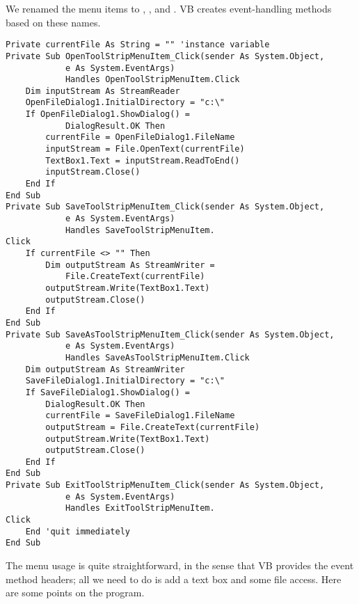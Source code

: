 		
		We renamed the menu items to , ,  and . VB creates event-handling methods based on these names.
		\begin{lstlisting}
Private currentFile As String = "" 'instance variable
Private Sub OpenToolStripMenuItem_Click(sender As System.Object,
			e As System.EventArgs)
			Handles OpenToolStripMenuItem.Click
	Dim inputStream As StreamReader
	OpenFileDialog1.InitialDirectory = "c:\"
	If OpenFileDialog1.ShowDialog() =
			DialogResult.OK Then
		currentFile = OpenFileDialog1.FileName
		inputStream = File.OpenText(currentFile)
		TextBox1.Text = inputStream.ReadToEnd()
		inputStream.Close()
	End If
End Sub
Private Sub SaveToolStripMenuItem_Click(sender As System.Object,
			e As System.EventArgs)
			Handles SaveToolStripMenuItem.
Click
	If currentFile <> "" Then
		Dim outputStream As StreamWriter =
			File.CreateText(currentFile)
		outputStream.Write(TextBox1.Text)
		outputStream.Close()
	End If
End Sub
Private Sub SaveAsToolStripMenuItem_Click(sender As System.Object,
			e As System.EventArgs)
			Handles SaveAsToolStripMenuItem.Click
	Dim outputStream As StreamWriter
	SaveFileDialog1.InitialDirectory = "c:\"
	If SaveFileDialog1.ShowDialog() =
		DialogResult.OK Then
		currentFile = SaveFileDialog1.FileName
		outputStream = File.CreateText(currentFile)
		outputStream.Write(TextBox1.Text)
		outputStream.Close()
	End If
End Sub
Private Sub ExitToolStripMenuItem_Click(sender As System.Object,
			e As System.EventArgs)
			Handles ExitToolStripMenuItem.
Click
	End 'quit immediately
End Sub
		\end{lstlisting}
		The menu usage is quite straightforward, in the sense that VB provides the event method headers; all we need to do is add a text box and some file access. Here are some points on the program.
